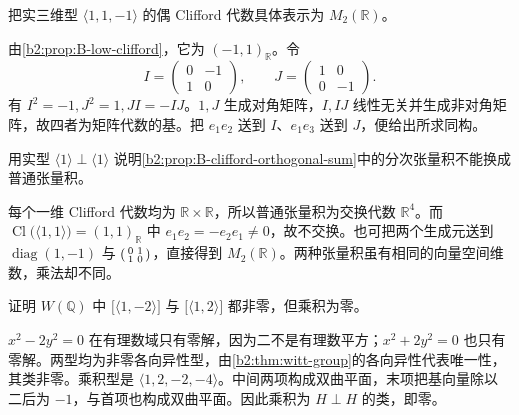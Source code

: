 \begin{exercise}\label{b2:ex:B-split-even-clifford}
	把实三维型 \(\langle1,1,-1\rangle\) 的偶 Clifford 代数具体表示为 \(M_2(\mathbb R)\)。
\end{exercise}
\begin{solution}
	由\cref{b2:prop:B-low-clifford}，它为 \((-1,1)_{\mathbb R}\)。令
	\[
		I=\begin{pmatrix}0&-1\\1&0\end{pmatrix},\qquad
		J=\begin{pmatrix}1&0\\0&-1\end{pmatrix}.
	\]
	有 \(I^2=-1,J^2=1,JI=-IJ\)。\(1,J\) 生成对角矩阵，\(I,IJ\) 线性无关并生成非对角矩阵，故四者为矩阵代数的基。把 \(e_1e_2\) 送到 \(I\)、\(e_1e_3\) 送到 \(J\)，便给出所求同构。
\end{solution}

\begin{exercise}\label{b2:ex:B-graded-tensor-necessary}
	用实型 \(\langle1\rangle\perp\langle1\rangle\) 说明\cref{b2:prop:B-clifford-orthogonal-sum}中的分次张量积不能换成普通张量积。
\end{exercise}
\begin{solution}
	每个一维 Clifford 代数均为 \(\mathbb R\times\mathbb R\)，所以普通张量积为交换代数 \(\mathbb R^4\)。而 \(\operatorname{Cl}\bigl(\langle1,1\rangle\bigr)=(1,1)_{\mathbb R}\) 中 \(e_1e_2=-e_2e_1\ne0\)，故不交换。也可把两个生成元送到 \(\operatorname{diag}(1,-1)\) 与 \(\begin{psmallmatrix}0&1\\1&0\end{psmallmatrix}\)，直接得到 \(M_2(\mathbb R)\)。两种张量积虽有相同的向量空间维数，乘法却不同。
\end{solution}

\begin{exercise}\label{b2:ex:B-witt-zero-divisors}
	证明 \(W(\mathbb Q)\) 中 \(\bigl[\langle1,-2\rangle\bigr]\) 与 \(\bigl[\langle1,2\rangle\bigr]\) 都非零，但乘积为零。
\end{exercise}
\begin{solution}
	\(x^2-2y^2=0\) 在有理数域只有零解，因为二不是有理数平方；\(x^2+2y^2=0\) 也只有零解。两型均为非零各向异性型，由\cref{b2:thm:witt-group}的各向异性代表唯一性，其类非零。乘积型是 \(\langle1,2,-2,-4\rangle\)。中间两项构成双曲平面，末项把基向量除以二后为 \(-1\)，与首项也构成双曲平面。因此乘积为 \(H\perp H\) 的类，即零。
\end{solution}

